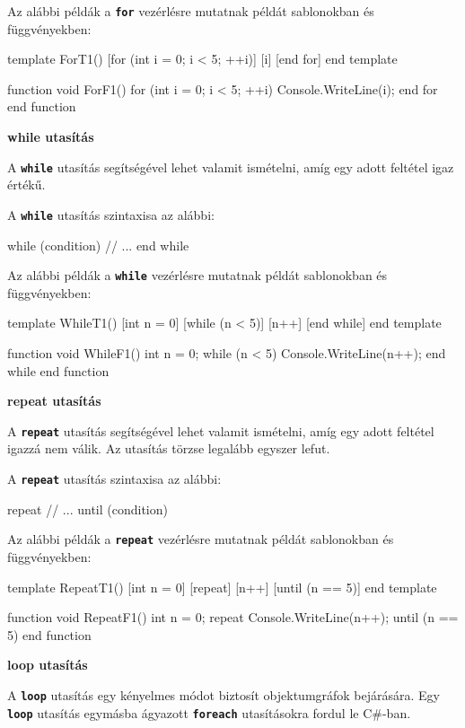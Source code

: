 \documentclass[12pt, a4paper]{report}
\newcommand{\ff}[1]{\textbf{\texttt{#1}}}
\newcommand{\bb}[1]{\textbf{#1}}
\begin{document}
Az alábbi példák a \ff{for} vezérlésre mutatnak példát sablonokban és függvényekben:

\begin{mgencode}
template ForT1()
  [for (int i = 0; i < 5; ++i)]
[i]
  [end for]
end template

function void ForF1()
  for (int i = 0; i < 5; ++i)
    Console.WriteLine(i);
  end for
end function
\end{mgencode}

\bb{while utasítás}

A \ff{while} utasítás segítségével lehet valamit ismételni, amíg egy adott feltétel igaz értékű.

A \ff{while} utasítás szintaxisa az alábbi:

\begin{mgencode}
while (condition)
// ...
end while
\end{mgencode}

Az alábbi példák a \ff{while} vezérlésre mutatnak példát sablonokban és függvényekben:

\begin{mgencode}
template WhileT1()
  [int n = 0]
  [while (n < 5)]
[n++]
  [end while]
end template

function void WhileF1()
  int n = 0;
  while (n < 5)
    Console.WriteLine(n++);
  end while
end function
\end{mgencode}

\bb{repeat utasítás}

A \ff{repeat} utasítás segítségével lehet valamit ismételni, amíg egy adott feltétel igazzá nem válik. Az utasítás törzse legalább egyszer lefut.

A \ff{repeat} utasítás szintaxisa az alábbi:

\begin{mgencode}
repeat
// ...
until (condition)
\end{mgencode}

Az alábbi példák a \ff{repeat} vezérlésre mutatnak példát sablonokban és függvényekben:

\begin{mgencode}
template RepeatT1()
  [int n = 0]
  [repeat]
[n++]
  [until (n == 5)]
end template

function void RepeatF1()
  int n = 0;
  repeat
    Console.WriteLine(n++);
  until (n == 5)
end function
\end{mgencode}

\bb{loop utasítás}

A \ff{loop} utasítás egy kényelmes módot biztosít objektumgráfok bejárására. Egy \ff{loop} utasítás egymásba ágyazott \ff{foreach} utasításokra fordul le C\#-ban.
\end{document}
